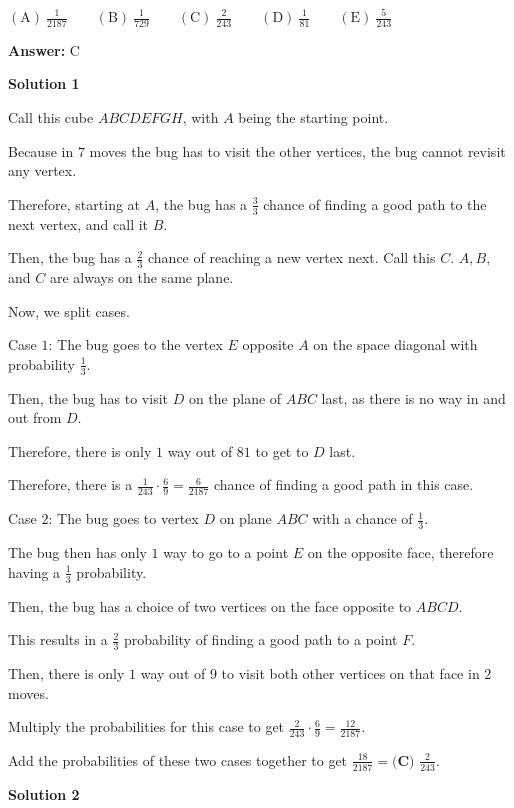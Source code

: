 \begin{enumerate}
 $\mathrm{(A) \ } \frac{1}{2187}\qquad \mathrm{(B) \ } \frac{1}{729}\qquad \mathrm{(C) \ } \frac{2}{243}\qquad \mathrm{(D) \ } \frac{1}{81}\qquad \mathrm{(E) \ }  \frac{5}{243}$

 \textbf{Answer: }C



\textbf{Solution 1}

Call this cube $ABCDEFGH$, with $A$ being the starting point.

 Because in $7$ moves the bug has to visit the other vertices, the bug cannot revisit any vertex.

 Therefore, starting at $A$, the bug has a $\frac{3}{3}$ chance of finding a good path to the next vertex, and call it $B$.

 Then, the bug has a $\frac{2}{3}$ chance of reaching a new vertex next. Call this $C$. $A, B,$ and $C$ are always on the same plane.

 Now, we split cases.

 Case $1$: The bug goes to the vertex $E$ opposite $A$ on the space diagonal with probability $\frac{1}{3}$.

 Then, the bug has to visit $D$ on the plane of $ABC$ last, as there is no way in and out from $D$.

 Therefore, there is only $1$ way out of $81$ to get to $D$ last.

 Therefore, there is a $\frac{1}{243} \cdot \frac{6}{9} = \frac{6}{2187}$ chance of finding a good path in this case.

 Case $2$: The bug goes to vertex $D$ on plane $ABC$ with a chance of $\frac{1}{3}$.

 The bug then has only $1$ way to go to a point $E$ on the opposite face, therefore having a $\frac{1}{3}$ probability.

 Then, the bug has a choice of two vertices on the face opposite to $ABCD$.

 This results in a $\frac{2}{3}$ probability of finding a good path to a point $F$.

 Then, there is only $1$ way out of $9$ to visit both other vertices on that face in $2$ moves.

 Multiply the probabilities for this case to get $\frac{2}{243} \cdot \frac{6}{9} = \frac{12}{2187}$.

 Add the probabilities of these two cases together to get $\frac{18}{2187} = \boxed{\textbf{(C) }\frac{2}{243}}.$




\textbf{Solution 2}



\end{enumerate}
